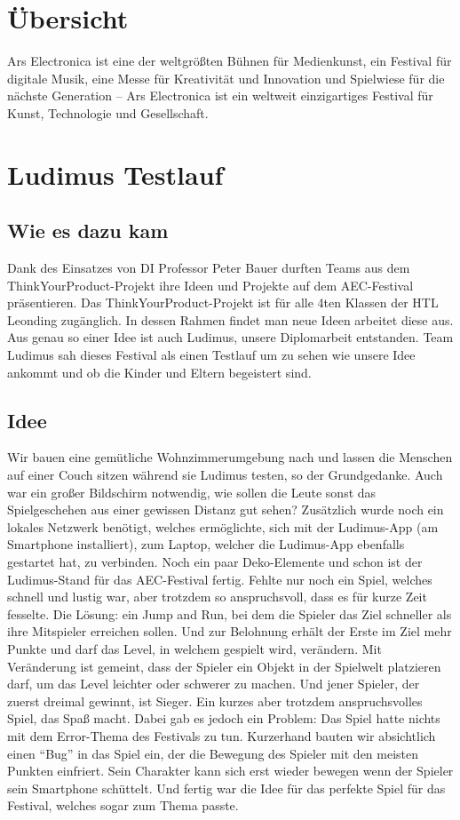 \section{Übersicht}
Ars Electronica ist eine der weltgrößten Bühnen für Medienkunst, ein Festival für digitale Musik, eine Messe für Kreativität und Innovation und Spielwiese für die nächste Generation – Ars Electronica ist ein weltweit einzigartiges Festival für Kunst, Technologie und Gesellschaft.
\section{Ludimus Testlauf}
\subsection{Wie es dazu kam}
Dank des Einsatzes von DI Professor Peter Bauer durften Teams aus dem ThinkYourProduct-Projekt ihre Ideen und Projekte auf dem AEC-Festival präsentieren. Das ThinkYourProduct-Projekt ist für alle 4ten Klassen der HTL Leonding zugänglich. In dessen Rahmen findet man neue Ideen arbeitet diese aus. Aus genau so einer Idee ist auch Ludimus, unsere Diplomarbeit entstanden. Team Ludimus sah dieses Festival als einen Testlauf um zu sehen wie unsere Idee ankommt und ob die Kinder und Eltern begeistert sind.
\subsection{Idee}\label{aecerror}
Wir bauen eine gemütliche Wohnzimmerumgebung nach und lassen die Menschen auf einer Couch sitzen während sie Ludimus testen, so der Grundgedanke. Auch war ein großer Bildschirm notwendig, wie sollen die Leute sonst das Spielgeschehen aus einer gewissen Distanz gut sehen? Zusätzlich wurde noch ein lokales Netzwerk benötigt, welches ermöglichte, sich mit der Ludimus-App (am Smartphone installiert), zum Laptop, welcher die Ludimus-App ebenfalls gestartet hat, zu verbinden. Noch ein paar Deko-Elemente und schon ist der Ludimus-Stand für das AEC-Festival fertig. Fehlte nur noch ein Spiel, welches schnell und lustig war, aber trotzdem so anspruchsvoll, dass es für kurze Zeit fesselte. Die Lösung: ein Jump and Run, bei dem die Spieler das Ziel schneller als ihre Mitspieler erreichen sollen. Und zur Belohnung erhält der Erste im Ziel mehr Punkte und darf das Level, in welchem gespielt wird, verändern. Mit Veränderung ist gemeint, dass der Spieler ein Objekt in der Spielwelt platzieren darf, um das Level leichter oder schwerer zu machen. Und jener Spieler, der zuerst dreimal gewinnt, ist Sieger. Ein kurzes aber trotzdem anspruchsvolles Spiel, das Spaß macht. Dabei gab es jedoch ein Problem: Das Spiel hatte nichts mit dem Error-Thema des Festivals zu tun. Kurzerhand bauten wir absichtlich einen “Bug” in das Spiel ein, der die Bewegung des Spieler mit den meisten Punkten einfriert. Sein Charakter kann sich erst wieder bewegen wenn der Spieler sein Smartphone schüttelt. Und fertig war die Idee für das perfekte Spiel für das Festival, welches sogar zum Thema passte.
